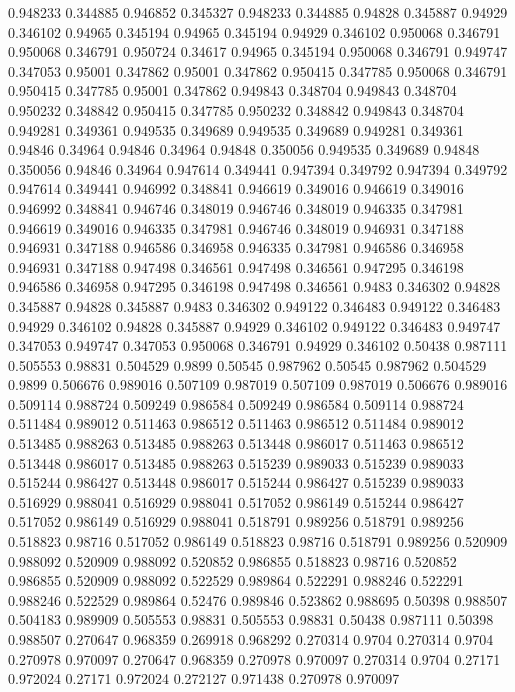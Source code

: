 0.948233 0.344885
0.946852 0.345327
0.948233 0.344885
0.94828 0.345887
0.94929 0.346102
0.94965 0.345194
0.94965 0.345194
0.94929 0.346102
0.950068 0.346791
0.950068 0.346791
0.950724 0.34617
0.94965 0.345194
0.950068 0.346791
0.949747 0.347053
0.95001 0.347862
0.95001 0.347862
0.950415 0.347785
0.950068 0.346791
0.950415 0.347785
0.95001 0.347862
0.949843 0.348704
0.949843 0.348704
0.950232 0.348842
0.950415 0.347785
0.950232 0.348842
0.949843 0.348704
0.949281 0.349361
0.949535 0.349689
0.949535 0.349689
0.949281 0.349361
0.94846 0.34964
0.94846 0.34964
0.94848 0.350056
0.949535 0.349689
0.94848 0.350056
0.94846 0.34964
0.947614 0.349441
0.947394 0.349792
0.947394 0.349792
0.947614 0.349441
0.946992 0.348841
0.946619 0.349016
0.946619 0.349016
0.946992 0.348841
0.946746 0.348019
0.946746 0.348019
0.946335 0.347981
0.946619 0.349016
0.946335 0.347981
0.946746 0.348019
0.946931 0.347188
0.946931 0.347188
0.946586 0.346958
0.946335 0.347981
0.946586 0.346958
0.946931 0.347188
0.947498 0.346561
0.947498 0.346561
0.947295 0.346198
0.946586 0.346958
0.947295 0.346198
0.947498 0.346561
0.9483 0.346302
0.94828 0.345887
0.94828 0.345887
0.9483 0.346302
0.949122 0.346483
0.949122 0.346483
0.94929 0.346102
0.94828 0.345887
0.94929 0.346102
0.949122 0.346483
0.949747 0.347053
0.949747 0.347053
0.950068 0.346791
0.94929 0.346102
0.50438 0.987111
0.505553 0.98831
0.504529 0.9899
0.50545 0.987962
0.50545 0.987962
0.504529 0.9899
0.506676 0.989016
0.507109 0.987019
0.507109 0.987019
0.506676 0.989016
0.509114 0.988724
0.509249 0.986584
0.509249 0.986584
0.509114 0.988724
0.511484 0.989012
0.511463 0.986512
0.511463 0.986512
0.511484 0.989012
0.513485 0.988263
0.513485 0.988263
0.513448 0.986017
0.511463 0.986512
0.513448 0.986017
0.513485 0.988263
0.515239 0.989033
0.515239 0.989033
0.515244 0.986427
0.513448 0.986017
0.515244 0.986427
0.515239 0.989033
0.516929 0.988041
0.516929 0.988041
0.517052 0.986149
0.515244 0.986427
0.517052 0.986149
0.516929 0.988041
0.518791 0.989256
0.518791 0.989256
0.518823 0.98716
0.517052 0.986149
0.518823 0.98716
0.518791 0.989256
0.520909 0.988092
0.520909 0.988092
0.520852 0.986855
0.518823 0.98716
0.520852 0.986855
0.520909 0.988092
0.522529 0.989864
0.522291 0.988246
0.522291 0.988246
0.522529 0.989864
0.52476 0.989846
0.523862 0.988695
0.50398 0.988507
0.504183 0.989909
0.505553 0.98831
0.505553 0.98831
0.50438 0.987111
0.50398 0.988507
0.270647 0.968359
0.269918 0.968292
0.270314 0.9704
0.270314 0.9704
0.270978 0.970097
0.270647 0.968359
0.270978 0.970097
0.270314 0.9704
0.27171 0.972024
0.27171 0.972024
0.272127 0.971438
0.270978 0.970097
